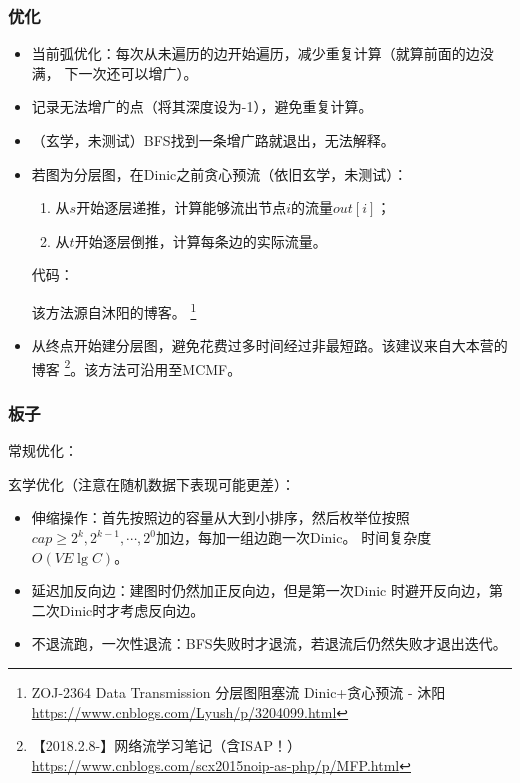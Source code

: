 \subsubsection{优化}
\begin{itemize}
	\item 当前弧优化：每次从未遍历的边开始遍历，减少重复计算（就算前面的边没满，
	      下一次还可以增广）。
	\item 记录无法增广的点（将其深度设为-1），避免重复计算。
	\item （玄学，未测试）BFS找到一条增广路就退出，无法解释。
	\item 若图为分层图，在Dinic之前贪心预流（依旧玄学，未测试）：
	      \begin{enumerate}
		      \item 从$s$开始逐层递推，计算能够流出节点$i$的流量$out[i]$；
		      \item 从$t$开始逐层倒推，计算每条边的实际流量。
	      \end{enumerate}
	      代码：

	      

	      该方法源自沐阳的博客。
	      \footnote{ZOJ-2364 Data Transmission 分层图阻塞流 Dinic+贪心预流 - 沐阳
			  \url{https://www.cnblogs.com/Lyush/p/3204099.html}}
	\item 从终点开始建分层图，避免花费过多时间经过非最短路。该建议来自大本营的博客
	\footnote{
	 【2018.2.8-】网络流学习笔记（含ISAP！）
		\url{https://www.cnblogs.com/scx2015noip-as-php/p/MFP.html}
	}。该方法可沿用至MCMF。
\end{itemize}

\subsubsection{板子}

常规优化：


玄学优化（注意在随机数据下表现可能更差）：

\begin{itemize}
	\item 伸缩操作：首先按照边的容量从大到小排序，然后枚举位按照
	$cap\geq 2^k,2^{k-1},\cdots,2^0$加边，每加一组边跑一次Dinic。
	时间复杂度$O(VE\lg C)$。
	\item 延迟加反向边：建图时仍然加正反向边，但是第一次Dinic
	时避开反向边，第二次Dinic时才考虑反向边。
	\item 不退流跑，一次性退流：BFS失败时才退流，若退流后仍然失败才退出迭代。
\end{itemize}

